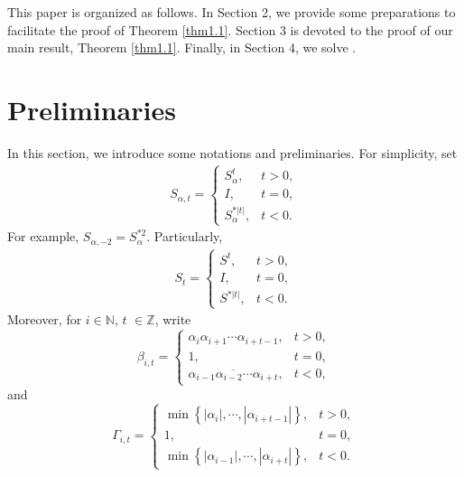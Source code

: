 \documentclass[11pt]{article}
\theoremstyle{plain}
\theoremstyle{definition}
\begin{document}
This paper is organized as follows. In Section 2, we provide some preparations to facilitate the proof of Theorem \ref{thm1.1}.
 Section 3 is devoted to the proof of our main result, Theorem \ref{thm1.1}.  Finally, in Section 4, we solve \cite[Problem 1 and Problem 2]{GA}.
 




\section{Preliminaries}

In this section, we  introduce some notations and preliminaries.
For simplicity, set
\begin{eqnarray}	S_{\alpha,t}= \begin{cases}
	S_{\alpha}^{t},& t > 0, \\
I,& t =0, \\
	S_{\alpha}^{*\left | t \right | },& t < 0.
\end{cases}\end{eqnarray}
For example, $S_{\alpha,-2}=S_\alpha^{*2}$. Particularly, 
\begin{eqnarray}
S_{t}= \begin{cases}
	S^{t},& t > 0, \\
I,& t =0, \\
	S^{*\left | t \right | },& t < 0.
\end{cases}
\end{eqnarray}
Moreover, for $i \in \mathbb{N}$, $t$ $\in \mathbb{Z}$,  write
\begin{equation}\label{eq1}
	\beta_{i,t} = \begin{cases}
		\alpha _{i}\alpha _{i+1}\cdots\alpha _{i+t-1},& t > 0, \\
1,& t =0, \\
		\overline{\alpha_{i-1}\alpha_{i-2} \cdots\alpha_{i+t}},& t < 0,
	\end{cases}
\end{equation}
and
\begin{equation}\label{eq71}\Gamma_{i,t} = \begin{cases}
	\min \left \{ \left | \alpha _{i} \right |, \cdots,\left | \alpha _{i+t-1} \right | \right \}  ,& t > 0, \\
1 ,& t= 0, \\
	\min \left \{ \left | \alpha_{i-1} \right |, \cdots,\left | \alpha_{i+t} \right | \right \},& t < 0.
\end{cases}\end{equation}
\end{document}

